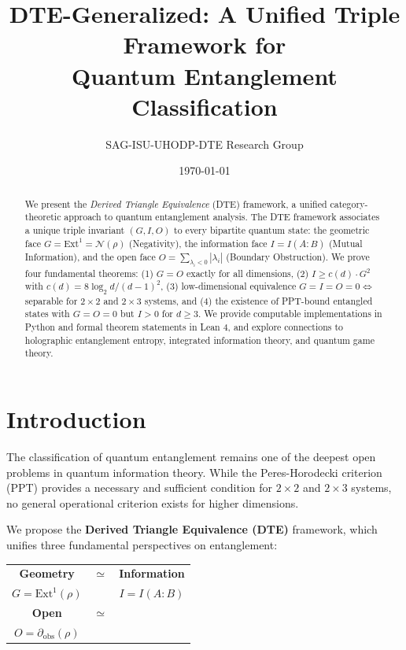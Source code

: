 \documentclass[11pt,a4paper]{article}
\title{\textbf{DTE-Generalized}: A Unified Triple Framework for\\Quantum Entanglement Classification}
\author{SAG-ISU-UHODP-DTE Research Group}
\date{\today}
\theoremstyle{definition}
\begin{document}
\maketitle

\begin{abstract}
We present the \textit{Derived Triangle Equivalence} (DTE) framework, a unified category-theoretic approach to quantum entanglement analysis. The DTE framework associates a unique triple invariant $(G, I, O)$ to every bipartite quantum state: the geometric face $G = \mathrm{Ext}^1 = \mathcal{N}(\rho)$ (Negativity), the information face $I = I(A:B)$ (Mutual Information), and the open face $O = \sum_{\lambda_i<0}|\lambda_i|$ (Boundary Obstruction). We prove four fundamental theorems: (1) $G = O$ exactly for all dimensions, (2) $I \geq c(d) \cdot G^2$ with $c(d) = 8\log_2 d / (d-1)^2$, (3) low-dimensional equivalence $G=I=O=0 \iff$ separable for $2\times2$ and $2\times3$ systems, and (4) the existence of PPT-bound entangled states with $G=O=0$ but $I>0$ for $d\geq 3$. We provide computable implementations in Python and formal theorem statements in Lean 4, and explore connections to holographic entanglement entropy, integrated information theory, and quantum game theory.
\end{abstract}

\section{Introduction}
\label{sec:intro}

The classification of quantum entanglement remains one of the deepest open problems in quantum information theory. While the Peres-Horodecki criterion (PPT) provides a necessary and sufficient condition for $2\times 2$ and $2\times 3$ systems, no general operational criterion exists for higher dimensions.

We propose the \textbf{Derived Triangle Equivalence (DTE)} framework, which unifies three fundamental perspectives on entanglement:

\begin{center}
\begin{tabular}{ccc}
\textbf{Geometry} & $\simeq$ & \textbf{Information} \\
$G = \mathrm{Ext}^1(\rho)$ & & $I = I(A:B)$ \\
\textbf{Open} & $\simeq$ & \\
$O = \partial_{\mathrm{obs}}(\rho)$ & &
\end{tabular}
\end{center}
\end{document}
